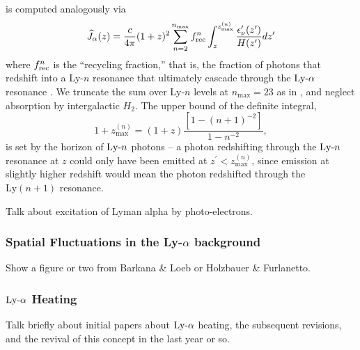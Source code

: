 is computed analogously via
\begin{equation}
    \widehat{J}_{\alpha}(z) = \frac{c}{4\pi} (1 + z)^2 \sum_{n = 2}^{n_{\text{max}}} f_{\text{rec}}^{n} \int_z^{z_{\max}^{(n)}} \frac{\epsilon_{\nu}^{\prime}(z^{\prime})}{H(z^{\prime})} dz^{\prime} \label{eq:LymanAlphaFlux}
\end{equation}
where $f_{\text{rec}}^{n}$ is the ``recycling fraction,'' that is, the fraction of photons that redshift into a Ly-$n$ resonance that ultimately cascade through the $\text{Ly-}\alpha$ resonance \cite{Pritchard2006}. We truncate the sum over Ly-$n$ levels at $n_{\max}=23$ as in \cite{Barkana2005}, and neglect absorption by intergalactic $H_2$. The upper bound of the definite integral,
\begin{equation}
    1 + z_{\max}^{(n)} = (1 + z) \frac{\left[1 - (n + 1)^{-2}\right]}{1 - n^{-2}} ,
\end{equation}
is set by the horizon of $\text{Ly-}n$ photons -- a photon redshifting through the  $\text{Ly-}n$ resonance at $z$ could only have been emitted at $z^{\prime} < z_{\max}^{(n)}$, since emission at slightly higher redshift would mean the photon redshifted through the $\text{Ly}(n+1)$ resonance.


Talk about excitation of Lyman alpha by photo-electrons.

\subsubsection{Spatial Fluctuations in the Ly-$\alpha$ background} 
{\color{red} Show a figure or two from Barkana \& Loeb or Holzbauer \& Furlanetto.}




\subsubsection{$\text{Ly-}\alpha$ Heating}
{\color{red} Talk briefly about initial papers about $\text{Ly-}\alpha$ heating, the subsequent revisions, and the revival of this concept in the last year or so.}


